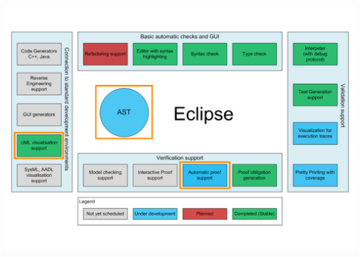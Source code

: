 \documentclass[slidestop,uncompress,mathserif,final]{beamer}
\begin{document}
\begin{frame}[c]
{\begin{center}
    \includegraphics[width=\textwidth]{images/overture_arch_cg.pdf}
  \end{center}
  }
\end{frame}
\end{document}
